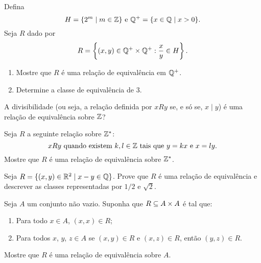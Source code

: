 \documentclass[12pt]{exam}
\begin{document}
    \vspace{.3cm}

    \questao{} Defina
    \[
        H = \{2^m \mid m \in \mathbb{Z}\} \mbox{ e } \mathbb{Q}^+ = \{x \in \mathbb{Q} \mid x > 0\}.
    \]
    Seja $R$ dado por
    \[
        R = \left\{(x,y) \in \mathbb{Q}^+\times \mathbb{Q}^+ : \frac{x}{y} \in H\right\}.
    \]
    \begin{enumerate}[label={\alph*})]
        \item Mostre que $R$ \'e uma rela\c{c}\~ao de equival\^encia em $\mathbb{Q}^+$.
        \item Determine a classe de equival\^encia de $3$.
    \end{enumerate}
    \vspace{.3cm}

    \questao{} A divisibilidade (ou seja, a rela{\c c}{\~a}o definida por $xRy$ se, e s{\'o}
    se, $x \mid y$) {\'e} uma rela{\c c}{\~a}o de equival{\^e}ncia sobre $\mathbb{Z}$?

    \vspace{.3cm}

    \questao{} Seja $R$ a seguinte rela{\c c}{\~a}o sobre $\mathbb{Z}^*$:
    \[
        x R y \mbox{ quando existem }  k, l \in \mathbb{Z} \mbox{ tais que } y = kx \mbox{ e } x = ly.
    \]
    Mostre que $R$ {\'e} uma rela{\c c}{\~a}o de equival{\^e}ncia sobre $\mathbb{Z}^*$.

    \vspace{.3cm}

    \questao{} Seja $R = \{ (x, y) \in \mathbb{R}^2 \mid x - y \in \mathbb{Q}\}$. Prove que $R$ {\'e} uma rela{\c c}{\~a}o de equival{\^e}ncia e descrever as classes representadas por $1/2$ e $\sqrt{2}$.

    \vspace{.3cm}

    \questao{} Seja $A$ um conjunto n\~ao vazio. Suponha que $R \subseteq A \times A$ \'e tal que:
    \begin{enumerate}[label={\alph*})]
        \item Para todo $x \in A$, $(x,x) \in R$;
        \item Para todos $x$, $y$, $z \in A$ se $(x, y) \in R$ e $(x,z) \in R$, ent\~ao $(y,z) \in R$.
    \end{enumerate}
    Mostre que $R$ \'e uma rela\c{c}\~ao de equival\^encia sobre $A$.
\end{document}
